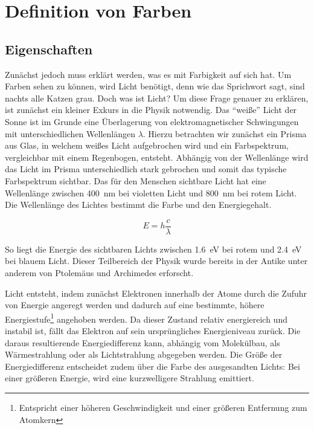 \documentclass[11pt]{scrreprt}
\begin{document}
\chapter{Definition von Farben}
\section{Eigenschaften }
 Zunächst jedoch muss erklärt werden, was es mit Farbigkeit auf sich hat. Um Farben sehen zu können, wird Licht benötigt, denn wie das Sprichwort sagt, sind nachts alle Katzen grau.  Doch was ist Licht? Um diese Frage genauer zu erklären, ist zunächst ein kleiner Exkurs in die Physik notwendig. Das \enquote{weiße} Licht der Sonne ist im Grunde eine Überlagerung von elektromagnetischer Schwingungen mit unterschiedlichen Wellenlängen $\lambda$. Hierzu betrachten wir zunächst ein Prisma aus Glas, in welchem weißes Licht aufgebrochen wird und ein Farbspektrum, vergleichbar mit einem Regenbogen, entsteht. Abhängig von der Wellenlänge wird das Licht im Prisma unterschiedlich stark gebrochen und somit das typische Farbspektrum sichtbar.  Das für den Menschen sichtbare Licht hat eine Wellenlänge zwischen \SI{400}{\nano\meter}  bei violetten Licht und \SI{800}{\nano\meter} bei rotem Licht. Die Wellenlänge des Lichtes bestimmt die Farbe und den Energiegehalt.

\begin{equation}
	E = h \frac{c}{\lambda}
\end{equation}

 So liegt die Energie des sichtbaren Lichts zwischen  \SI{1,6}{\electronvolt} bei rotem und  \SI{2,4}{\electronvolt} bei blauem Licht. Dieser Teilbereich der Physik wurde bereits in der Antike unter anderem von Ptolemäus und Archimedes erforscht.

Licht entsteht, indem zunächst Elektronen innerhalb der Atome durch die Zufuhr von Energie angeregt werden und dadurch auf eine bestimmte, höhere Energiestufe\footnote{ Entspricht einer höheren Geschwindigkeit und einer größeren Entfernung zum Atomkern} angehoben werden. Da dieser Zustand relativ energiereich und  instabil ist, fällt das Elektron auf sein ursprüngliches Energieniveau zurück. Die daraus resultierende Energiedifferenz kann, abhängig vom Molekülbau, als Wärmestrahlung oder als Lichtstrahlung abgegeben werden. Die Größe der Energiedifferenz entscheidet zudem über die Farbe des ausgesandten Lichts: Bei einer größeren Energie, wird eine kurzwelligere Strahlung emittiert.
\end{document}
